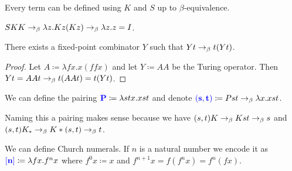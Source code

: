 \begin{rem}
    Every term can be defined using $K$ and $S$ up to $\beta$-equivalence.
\end{rem}

\begin{example}
    $SKK \to_{\beta} \lambda z. Kz(Kz) \to_{\beta} \lambda z.z = I$.
\end{example}

\begin{boxprop} \label{prop:fixpoi}
    There exists a \alert{fixed-point combinator} $Y$ such that $Y t \to_{\beta} t(Yt)$.
\end{boxprop}
\begin{proof}
    Let $A \coloneq \lambda fx. x(ffx)$ and let $Y \coloneq AA$ be the \alert{Turing operator}.
    Then $Yt = AAt \to_{\beta} t (AAt) = t(Yt)$.
\end{proof}

\begin{boxdefi}
    We can define the \alert{pairing} $\alert{P} \coloneq \lambda stx.xst$ and denote $\alert{(s, t)} \coloneq Pst \bered \lambda x. xst$.
\end{boxdefi}

\begin{rem}
    Naming this a pairing makes sense because we have $(s, t) K \to_{\beta} Kst \to_{\beta} s$ and $(s, t) K_* \to_{\beta} K*(s, t) \to_{\beta} t$.
\end{rem}

\begin{boxdefi}
    We can define \alert{Church numerals}.
    If $n$ is a natural number we encode it as $\alert{[n]} \coloneq \lambda fx. f^n x$ where $f^0 x \coloneq x$ and $f^{n+1} x = f(f^nx) = f^n(fx)$.
\end{boxdefi}

